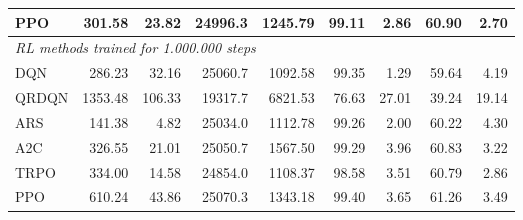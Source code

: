 \begin{samepage}
\begin{center}
\begin{tabular}{l|rr|rr|rr|rr}
    PPO          &   301.58 &    23.82 &    24996.3 &    1245.79 &   99.11 &    2.86 &   60.90 &    2.70 \\
    \midrule
    \multicolumn{9}{l}{\textit{RL methods trained for 1.000.000 steps}} \\
    \midrule
    DQN          &   286.23 &    32.16 &    25060.7 &    1092.58 &   99.35 &    1.29 &   59.64 &    4.19 \\
    QRDQN        &  1353.48 &   106.33 &    19317.7 &    6821.53 &   76.63 &   27.01 &   39.24 &   19.14 \\
    ARS          &   141.38 &     4.82 &    25034.0 &    1112.78 &   99.26 &    2.00 &   60.22 &    4.30 \\
    A2C          &   326.55 &    21.01 &    25050.7 &    1567.50 &   99.29 &    3.96 &   60.83 &    3.22 \\
    TRPO         &   334.00 &    14.58 &    24854.0 &    1108.37 &   98.58 &    3.51 &   60.79 &    2.86 \\
    PPO          &   610.24 &    43.86 &    25070.3 &    1343.18 &   99.40 &    3.65 &   61.26 &    3.49 \\
    \bottomrule
  \end{tabular}
\end{center}
\end{samepage}

